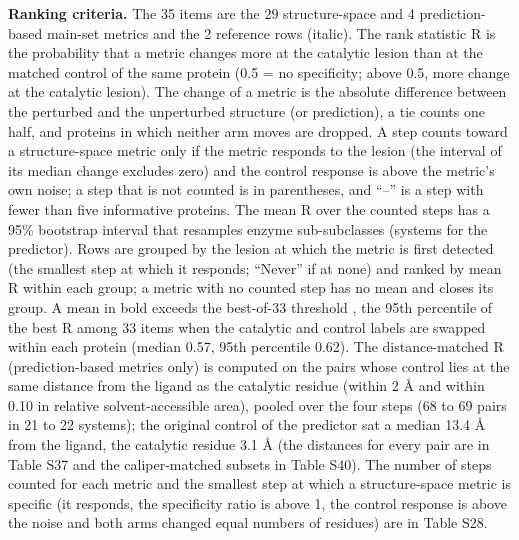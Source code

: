 \documentclass[
  10pt,
]{article}
\DeclareRobustCommand{\_}{\textunderscore\hspace{0pt}}
\begin{document}
\textbf{Ranking
criteria.} The 35
items are the 29
structure-space and
4 prediction-based
main-set metrics and
the 2 reference rows
(italic). The rank
statistic R is the
probability that a
metric changes more
at the catalytic
lesion than at the
matched control of
the same protein
(0.5 = no
specificity; above
0.5, more change at
the catalytic
lesion). The change
of a metric is the
absolute difference
between the
perturbed and the
unperturbed
structure (or
prediction), a tie
counts one half, and
proteins in which
neither arm moves
are dropped. A step
counts toward a
structure-space
metric only if the
metric responds to
the lesion (the
interval of its
median change
excludes zero) and
the control response
is above the
metric's own noise;
a step that is not
counted is in
parentheses, and
``--'' is a step
with fewer than five
informative
proteins. The mean R
over the counted
steps has a 95\%
bootstrap interval
that resamples
enzyme
sub-subclasses
(systems for the
predictor). Rows are
grouped by the
lesion at which the
metric is first
detected (the
smallest step at
which it responds;
``Never'' if at
none) and ranked by
mean R within each
group; a metric with
no counted step has
no mean and closes
its group. A mean in
bold exceeds the
best-of-33 threshold
\cite{westfall1993},
the 95th percentile
of the best R among
33 items when the
catalytic and
control labels are
swapped within each
protein (median
0.57, 95th
percentile 0.62).
The distance-matched
R (prediction-based
metrics only) is
computed on the
pairs whose control
lies at the same
distance from the
ligand as the
catalytic residue
(within 2 Å and
within 0.10 in
relative
solvent-accessible
area), pooled over
the four steps (68
to 69 pairs in 21 to
22 systems); the
original control of
the predictor sat a
median 13.4 Å from
the ligand, the
catalytic residue
3.1 Å (the distances
for every pair are
in Table S37 and the
caliper-matched
subsets in Table
S40). The number of
steps counted for
each metric and the
smallest step at
which a
structure-space
metric is specific
(it responds, the
specificity ratio is
above 1, the control
response is above
the noise and both
arms changed equal
numbers of residues)
are in Table S28.
\end{document}
